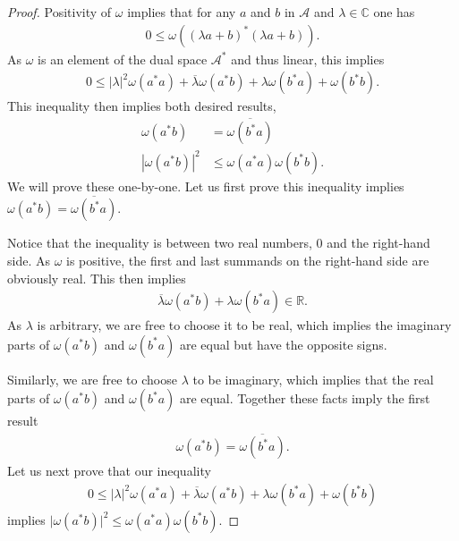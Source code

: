 \begin{proof}
\leanok
Positivity of $\omega$ implies that for any $a$ and $b$ in $\mathcal{A}$ and $\lambda \in \mathbb{C}$ one has
\begin{align}
    0 \le \omega\left((\lambda a + b)^*(\lambda a + b)\right).
\end{align}
As $\omega$ is an element of the dual space $\mathcal{A}^*$ and thus linear, this implies
\begin{align}
    0 \le |\lambda|^2\omega(a^*a) + \overline{\lambda}\omega(a^*b) + \lambda\omega(b^*a) + \omega(b^*b).
\end{align}
This inequality then implies both desired results,
\begin{align}
    \omega(a^*b) &= \overline{\omega(b^*a)} \\
    |\omega(a^*b)|^2 &\le \omega(a^*a) \omega(b^*b).
\end{align}
We will prove these one-by-one. Let us first prove this inequality implies $\omega(a^*b) = \overline{\omega(b^*a)}$.

Notice that the inequality is between two real numbers, $0$ and the right-hand side. As $\omega$ is positive, the first and last summands on the right-hand side are obviously real. This then implies
\begin{align}
    \overline{\lambda}\omega(a^*b) + \lambda\omega(b^*a) \in \mathbb{R}.
\end{align}
As $\lambda$ is arbitrary, we are free to choose it to be real, which implies the imaginary parts of $\omega(a^*b)$ and $\omega(b^*a)$ are equal but have the opposite signs.

Similarly, we are free to choose $\lambda$ to be imaginary, which implies that the real parts of $\omega(a^*b)$ and $\omega(b^*a)$ are equal. Together these facts imply the first result
\begin{align}
    \omega(a^*b) = \overline{\omega(b^*a)}.
\end{align}
Let us next prove that our inequality
\begin{align}
    0 \le |\lambda|^2\omega(a^*a) + \overline{\lambda}\omega(a^*b) + \lambda\omega(b^*a) + \omega(b^*b)
\end{align}
implies $\lvert \omega(a^*b) \rvert^2 \le \omega(a^*a) \omega(b^*b)$.


\end{proof}
